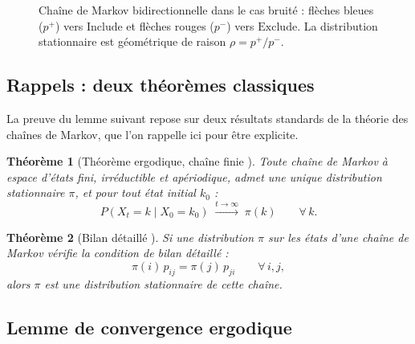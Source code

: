 \documentclass[12pt,a4paper]{article}
\newtheorem{theorem}{Théorème}[section]
\theoremstyle{remark}
\newcommand{\Inc}{\ensuremath{\mathrm{Include}}}
\newcommand{\Exc}{\ensuremath{\mathrm{Exclude}}}
\begin{document}
\begin{figure}[h]
\caption{Chaîne de Markov bidirectionnelle dans le cas bruité : flèches bleues ($p^+$) vers
\Inc{} et flèches rouges ($p^-$) vers \Exc.  La distribution stationnaire est géométrique
de raison $\rho = p^+/p^-$.}
\label{fig:chaine_bruit}
\end{figure}

\subsection{Rappels : deux théorèmes classiques}

La preuve du lemme suivant repose sur deux résultats standards de la théorie des chaînes
de Markov, que l'on rappelle ici pour être explicite.

\begin{theorem}[Théorème ergodique, chaîne finie {\normalfont\cite{norris1997}}]\label{thm:ergo}
Toute chaîne de Markov à espace d'états fini, \emph{irréductible} et \emph{apériodique},
admet une unique distribution stationnaire $\pi$, et pour tout état initial $k_0$ :
\[
  P(X_t = k \mid X_0 = k_0) \;\xrightarrow{t\to\infty}\; \pi(k) \qquad \forall\, k.
\]
\end{theorem}

\begin{theorem}[Bilan détaillé {\normalfont\cite{norris1997}}]\label{thm:balance}
Si une distribution $\pi$ sur les états d'une chaîne de Markov vérifie la condition de
\emph{bilan détaillé} :
\[
  \pi(i)\,p_{ij} = \pi(j)\,p_{ji} \qquad \forall\, i,j,
\]
alors $\pi$ est une distribution stationnaire de cette chaîne.
\end{theorem}

\subsection{Lemme de convergence ergodique}
\end{document}
